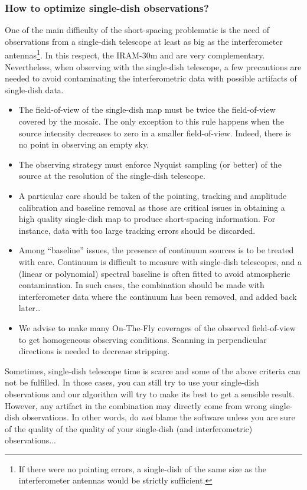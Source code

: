 \subsubsection{How to optimize single-dish observations?}

One of the main difficulty of the short-spacing problematic is the need of
observations from a single-dish telescope at least as big as the
interferometer antennas\footnote{If there were no pointing errors,
a single-dish of the same size as the interferometer antennas
would be strictly sufficient.}. In this respect, the IRAM-30m and \NOEMA{} are very
complementary. Nevertheless, when observing with the single-dish telescope,
a few precautions are needed to avoid contaminating the interferometric
data with possible artifacts of single-dish data.
\begin{itemize}\itemsep 0pt
\item The field-of-view of the single-dish map must be twice the
  field-of-view covered by the mosaic. The only exception to this rule
  happens when the source intensity decreases to zero in a smaller
  field-of-view. Indeed, there is no point in observing an empty sky.
\item The observing strategy must enforce Nyquist sampling (or better) of
  the source at the resolution of the single-dish telescope.
\item A particular care should be taken of the pointing, tracking and
  amplitude calibration and baseline removal as those are critical issues
  in obtaining a high quality single-dish map to produce short-spacing
  information. For instance, data with too large tracking errors should be
  discarded.
\item Among ``baseline'' issues, the presence of continuum sources
  is to be treated with care. Continuum is difficult to measure with
  single-dish telescopes, and a (linear or polynomial) spectral baseline
  is often fitted to avoid atmospheric contamination. In such cases,
  the combination should be made with interferometer data where the 
  continuum has been removed, and added back later\ldots 
\item We advise to make many On-The-Fly coverages of the observed
  field-of-view to get homogeneous observing conditions. Scanning in
  perpendicular directions is needed to decrease stripping.  
\end{itemize}
Sometimes, single-dish telescope time is scarce and some of the above
criteria can not be fulfilled. In those cases, you can still try to use
your single-dish observations and our algorithm will try to make its best
to get a sensible result. However, any artifact in the combination may
directly come from wrong single-dish observations. In other words, do
\emph{not} blame the software unless you are sure of the quality of the
quality of your single-dish (and interferometric) observations...

